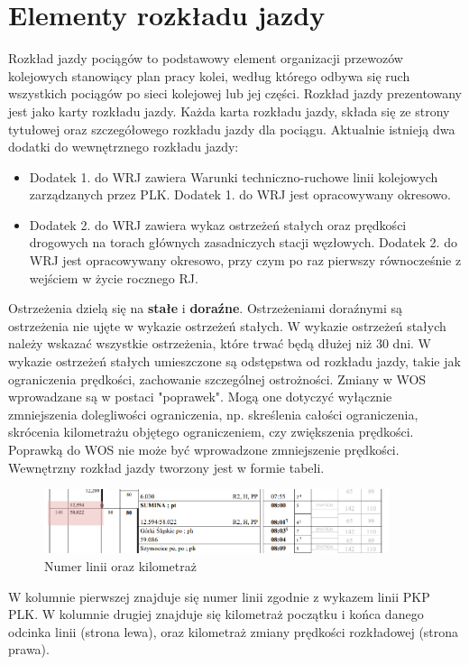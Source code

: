\section{Elementy rozkładu jazdy}
Rozkład jazdy pociągów to podstawowy element organizacji przewozów kolejowych stanowiący plan pracy kolei, według którego odbywa się ruch wszystkich pociągów po sieci kolejowej lub jej części.  Rozkład jazdy prezentowany jest jako karty rozkładu jazdy. Każda karta rozkładu jazdy, składa się ze strony tytułowej oraz szczegółowego rozkładu jazdy dla pociągu. Aktualnie istnieją dwa dodatki do wewnętrznego rozkładu jazdy:
\begin{tcolorbox}[colback=green!5!white,colframe=green!75!black,width=0.9\textwidth,title=Dodatki do rozkładu jazdy]
\begin{itemize}
	\item Dodatek 1. do WRJ zawiera Warunki techniczno-ruchowe linii kolejowych zarządzanych przez PLK. Dodatek 1. do WRJ jest
	opracowywany okresowo.
	\item Dodatek 2. do WRJ zawiera wykaz ostrzeżeń stałych oraz prędkości drogowych na torach głównych zasadniczych stacji
	węzłowych. Dodatek 2. do WRJ jest opracowywany okresowo, przy czym po raz pierwszy równocześnie z wejściem w życie rocznego RJ.
\end{itemize}
\end{tcolorbox}
Ostrzeżenia dzielą się na \textbf{stałe} i \textbf{doraźne}. Ostrzeżeniami doraźnymi są ostrzeżenia nie ujęte w wykazie ostrzeżeń stałych. W wykazie ostrzeżeń stałych należy wskazać wszystkie ostrzeżenia, które trwać będą dłużej niż 30 dni.
W wykazie ostrzeżeń stałych umieszczone są odstępstwa od rozkładu jazdy, takie jak ograniczenia prędkości, zachowanie szczególnej ostrożności. Zmiany w WOS wprowadzane są w postaci "poprawek". Mogą one dotyczyć wyłącznie zmniejszenia dolegliwości ograniczenia, np. skreślenia całości ograniczenia, skrócenia kilometrażu objętego ograniczeniem, czy zwiększenia prędkości. Poprawką do WOS nie może być wprowadzone zmniejszenie prędkości. 
Wewnętrzny rozkład jazdy tworzony jest w formie tabeli. \begin{figure}
	\includegraphics[width=0.9\textwidth]{skryptkierownik-img/numer-linii.png}
	\caption{Numer linii oraz kilometraż}
\end{figure} W kolumnie pierwszej znajduje się numer linii zgodnie z wykazem linii PKP PLK. W kolumnie drugiej znajduje się kilometraż początku i końca danego odcinka linii (strona lewa), oraz kilometraż zmiany prędkości rozkładowej (strona prawa). 

